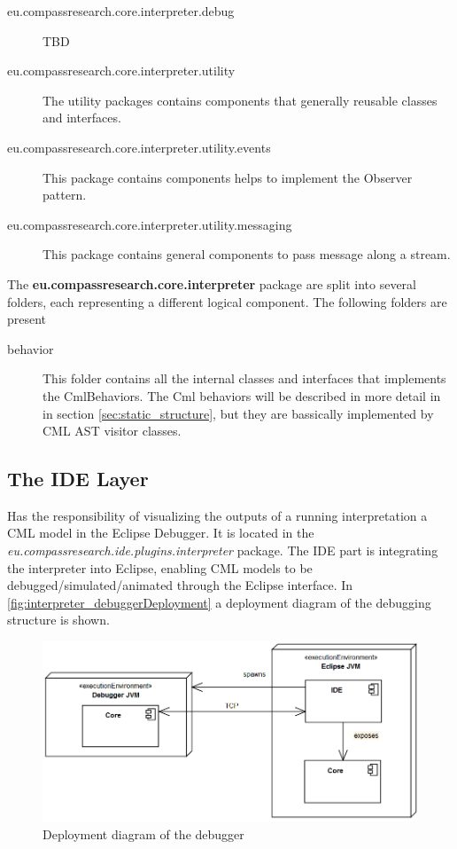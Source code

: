 \documentclass[a4paper, 10pt]{include/compassreport}   %
\begin{document}
\begin{description}
\item[eu.compassresearch.core.interpreter.debug] TBD

\item[eu.compassresearch.core.interpreter.utility] The utility
  packages contains components that generally reusable classes and
  interfaces. 

\item[eu.compassresearch.core.interpreter.utility.events] This package
  contains components helps to implement the Observer pattern. 

\item[eu.compassresearch.core.interpreter.utility.messaging] This
  package contains general components to pass message along a stream.

\end{description}

The \textbf{eu.compassresearch.core.interpreter} package are split into several
folders, each representing a different logical component. The
following folders are present

\begin{description}
\item[behavior] This folder contains all the internal classes and
  interfaces that implements the CmlBehaviors. The Cml behaviors will be
  described in more detail in in section \ref{sec:static_structure}, but
  they are bassically implemented by CML AST visitor classes.
\end{description}

\subsection{The IDE Layer}

Has the responsibility of visualizing the outputs of
  a running interpretation a CML model in the Eclipse Debugger. It is
  located in the \emph{eu.compassresearch.ide.plugins.interpreter}
  package.
The IDE part is integrating the interpreter into Eclipse, enabling CML
models to be debugged/simulated/animated through the Eclipse
interface. In \autoref{fig:interpreter_debuggerDeployment} a
deployment diagram of the debugging structure is shown.

\begin{figure}[ht!]
  \begin{center}
    \includegraphics[width=1\textwidth]{figures/DebuggerDeploymentView}
    \caption{Deployment diagram of the debugger}
    \label{fig:interpreter_debuggerDeployment}
   \end{center}
\end{figure}
\end{document}
